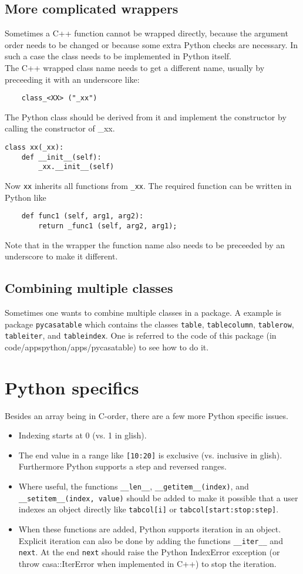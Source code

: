 \subsection{More complicated wrappers}
Sometimes a C++ function cannot be wrapped directly, because the argument
order needs to be changed or because some extra Python checks are
necessary.
In such a case the class needs to be implemented in Python itself.
\\The C++ wrapped class name needs to get a different name,
usually by preceeding it with an underscore like:
\begin{verbatim}
    class_<XX> ("_xx")
\end{verbatim}
The Python class should be derived from it and implement the
constructor by calling the constructor of \_xx.
\begin{verbatim}
class xx(_xx):
    def __init__(self):
        _xx.__init__(self)
\end{verbatim}
Now \texttt{xx} inherits all functions from \texttt{\_xx}.
The required function can be written in Python like
\begin{verbatim}
    def func1 (self, arg1, arg2):
        return _func1 (self, arg2, arg1);
\end{verbatim}
Note that in the wrapper the function name also needs to be
preceeded by an underscore to make it different.

\subsection{Combining multiple classes}
Sometimes one wants to combine multiple classes in a package. A
example is package \texttt{pycasatable} which contains the classes
\texttt{table}, \texttt{tablecolumn}, \texttt{tablerow},
\texttt{tableiter}, and \texttt{tableindex}. One is referred to the
code of this package (in code/appspython/apps/pycasatable) to see how
to do it.

\section{Python specifics}
Besides an array being in C-order, there are a few more Python
specific issues.
\begin{itemize}
\item Indexing starts at 0 (vs. 1 in glish).
\item The end value in a range like \texttt{[10:20]} is exclusive
(vs. inclusive in glish). Furthermore Python supports a step and
reversed ranges.
\item Where useful, the functions \texttt{\_\_len\_\_},
\texttt{\_\_getitem\_\_(index)}, and
\texttt{\_\_setitem\_\_(index, value)} should
be added to make it possible that a user indexes an object directly like
\texttt{tabcol[i]} or \texttt{tabcol[start:stop:step]}.
\item When these functions are added, Python supports iteration in an
object. Explicit iteration can also be done by adding the functions
\texttt{\_\_iter\_\_} and \texttt{next}. At the end \texttt{next}
should raise the Python IndexError exception (or throw casa::IterError
when implemented in C++) to stop the iteration.
\end{itemize}

